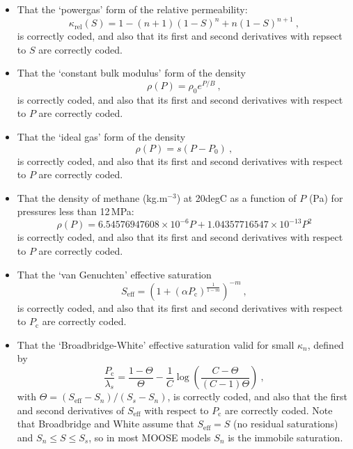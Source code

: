 \documentclass[]{scrreprt}
\begin{document}
\begin{itemize}
\item That the `powergas' form of the relative permeability:
\begin{equation}
\kappa_{\mathrm{rel}}(S) = 1 - (n+1)(1-S)^{n} + n(1-S)^{n+1} \ ,
\end{equation}
is correctly coded, and also that its first and second derivatives
with repsect to $S$ are correctly coded.


\item That the `constant bulk modulus' form of the density
\begin{equation}
\rho(P) = \rho_{0}e^{P/B} \ ,
\end{equation}
is correctly coded, and also that its first and second derivatives
with respect to $P$ are correctly coded.

\item That the `ideal gas' form of the density
\begin{equation}
\rho(P) = s(P-P_{\mathrm{0}}) \ ,
\end{equation}
is correctly coded, and also that its first and second derivatives
with respect to $P$ are correctly coded.

\item That the density of methane (kg.m$^{-3}$) at 20degC as a
  function of $P$ (Pa) for pressures less than 12\,MPa: 
\begin{equation}
\rho(P) = 6.54576947608\times 10^{-6}P + 1.04357716547\times 10^{-13} P^{2}
\end{equation}
is correctly coded, and also that its first and second derivatives
with respect to $P$ are correctly coded.

\item That the `van Genuchten' effective saturation
\begin{equation}
S_{\mathrm{eff}} = \left(1 + (\alpha
P_{\mathrm{c}})^{\frac{1}{1-m}}\right)^{-m} \ ,
\end{equation}
is correctly coded, and also that its first and second derivatives
with respect to $P_{\mathrm{c}}$ are correctly coded.

\item That the `Broadbridge-White' effective saturation valid for
  small $\kappa_{n}$, defined by
\begin{equation}
\frac{P_{\mathrm{c}}}{\lambda_{s}} = \frac{1-\Theta}{\Theta} - \frac{1}{C}\log
\left( \frac{C-\Theta}{(C-1)\Theta} \right) \ ,
\end{equation}
with $\Theta = (S_{\mathrm{eff}} - S_{n})/(S_{s}-S_{n})$, 
is correctly coded, and also that the first and second derivatives of
$S_{\mathrm{eff}}$ with respect to $P_{\mathrm{c}}$ are correctly
coded.  Note that Broadbridge and White assume that
$S_{\mathrm{eff}}=S$ (no residual saturations) and $S_{n}\leq S \leq
S_{s}$, so in most MOOSE models $S_{n}$ is the immobile saturation.


\end{itemize}
\end{document}
